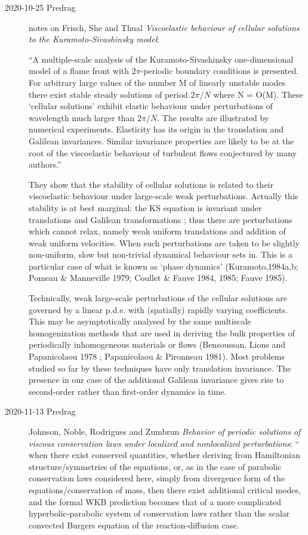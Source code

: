 \begin{description}
\item[2020-10-25 Predrag]
notes on Frisch, She and Thual
 {\em Viscoelastic
behaviour of cellular solutions to the Kuramoto-Sivashinsky model}:

``A multiple-scale analysis of the Kuramoto-Sivashinsky one-dimensional
model of a flame front with $2\pi$-periodic boundary conditions is presented.
For arbitrary large values of the number M of linearly unstable modes
there exist stable steady solutions of period $2\pi/N$ where N = O(M). These
`cellular solutions' exhibit elastic behaviour under perturbations of
wavelength much larger than $2\pi/N$. The results are illustrated by
numerical experiments. Elasticity has its origin in the translation and
Galilean invariances. Similar invariance properties are likely to be at
the root of the viscoelastic behaviour of turbulent flows conjectured by
many authors.''

They show that the stability of cellular solutions is related to their
viscoelastic behaviour under large-scale weak perturbations. Actually
this stability is at best marginal: the KS equation is invariant under
translations and Galilean transformations ; thus there are perturbations
which cannot relax, namely weak uniform translations and addition of weak
uniform velocities. When such perturbations are taken to be slightly
non-uniform, slow but non-trivial dynamical behaviour sets in. This is a
particular case of what is known as `phase dynamics'
(Kuramoto,1984a,b; Pomeau \& Manneville 1979;
Coullet \& Fauve 1984, 1985; Fauve 1985).

Technically, weak large-scale perturbations of the cellular solutions are
governed by a linear p.d.e. with (spatially) rapidly varying
coefficients. This may be asymptotically analysed by the same multiscale
homogenization methods that are used in deriving the bulk properties of
periodically inhomogeneous materials or flows (Bensoussan, Lions and
Papanicolaou 1978 ; Papanicolaou \& Pironneau 1981). Most problems studied
so far by these techniques have only translation invariance. The presence
in our case of the additional Galilean invariance gives rise to
second-order rather than first-order dynamics in time.

\item[2020-11-13 Predrag]
Johnson, Noble, Rodrigues  and Zumbrun {\em  Behavior of
periodic solutions of viscous conservation laws under localized and
nonlocalized perturbations}: ``
when there exist conserved quantities, whether deriving from Hamiltonian
structure/symmetries of the equations, or, as in the case of
parabolic conservation laws considered here, simply from divergence form
of the equations/conservation of mass, then there exist additional
critical modes, and the formal WKB prediction becomes that of a more
complicated hyperbolic-parabolic system of conservation laws rather than
the scalar convected Burgers equation of the reaction-diffusion case.


\end{description}
